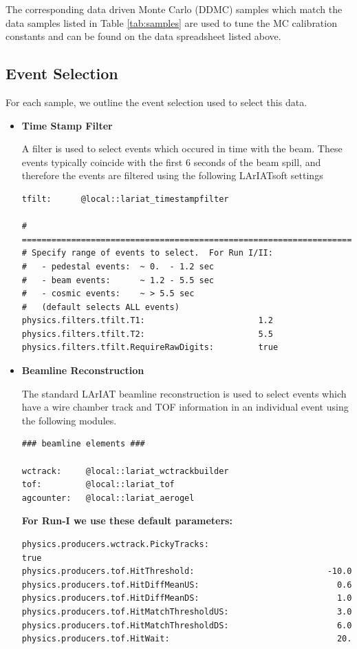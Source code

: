 The corresponding data driven Monte Carlo (DDMC) samples which match the data samples listed in Table \ref{tab:samples} are used to tune the MC calibration constants and can be found on the data spreadsheet listed above.



\subsection{Event Selection}\label{sec:EventSelection}
For each sample, we outline the event selection used to select this data.

\begin{itemize}
\item \textbf{Time Stamp Filter}

A filter is used to select events which occured in time with the beam. These events typically coincide with the first 6 seconds of the beam spill, and therefore the events are filtered using the following LArIATsoft settings

\begin{verbatim}
tfilt:      @local::lariat_timestampfilter

# ====================================================================
# Specify range of events to select.  For Run I/II:
#   - pedestal events:  ~ 0.  - 1.2 sec
#   - beam events:      ~ 1.2 - 5.5 sec
#   - cosmic events:    ~ > 5.5 sec
#   (default selects ALL events)
physics.filters.tfilt.T1:                       1.2
physics.filters.tfilt.T2:                       5.5
physics.filters.tfilt.RequireRawDigits:         true

\end{verbatim}



\item \textbf{Beamline Reconstruction}

The standard LArIAT beamline reconstruction is used to select events which have a wire chamber track and TOF information in an individual event using the following modules.
\begin{verbatim}
### beamline elements ###

wctrack:     @local::lariat_wctrackbuilder
tof:         @local::lariat_tof
agcounter:   @local::lariat_aerogel
\end{verbatim}


\textbf{For Run-I we use these default parameters:}
\begin{verbatim} 
physics.producers.wctrack.PickyTracks:                          true
physics.producers.tof.HitThreshold:                           -10.0  
physics.producers.tof.HitDiffMeanUS:                            0.6  
physics.producers.tof.HitDiffMeanDS:                            1.0  
physics.producers.tof.HitMatchThresholdUS:                      3.0  
physics.producers.tof.HitMatchThresholdDS:                      6.0  
physics.producers.tof.HitWait:                                  20.
\end{verbatim}


\end{itemize}
